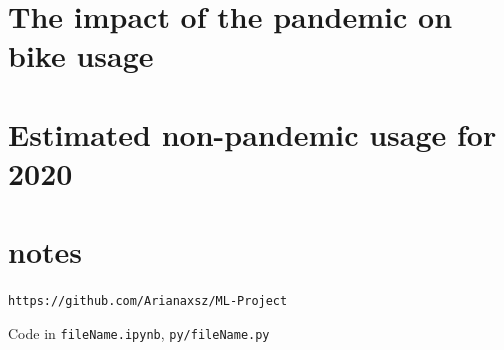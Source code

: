 \documentclass[12pt,letterpaper]{article}
\begin{document}
\section{The impact of the pandemic on bike usage}

\section{Estimated non-pandemic usage for 2020}




\section*{notes}
\texttt{https://github.com/Arianaxsz/ML-Project}

Code in \texttt{fileName.ipynb}, \texttt{py/fileName.py}






%
\end{document}
